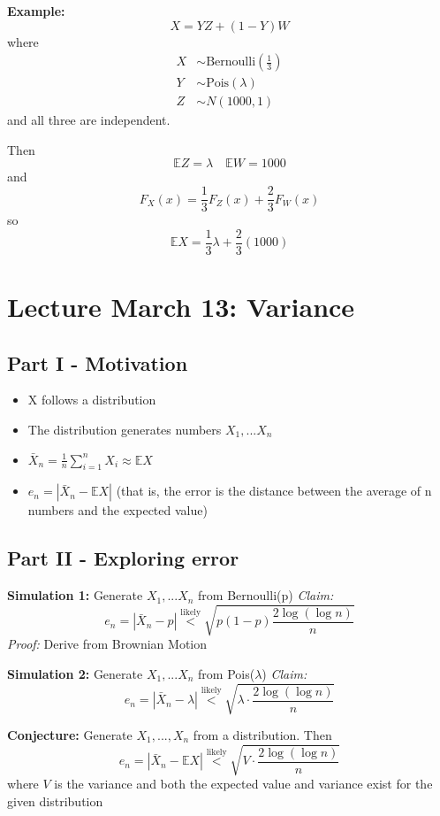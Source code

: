 \documentclass[12pt]{article}
\begin{document}
\textbf{Example:} 
\[X = YZ + (1 - Y)W\]
where 
\begin{align*}
    X &\sim \text{Bernoulli}(\frac{1}{3})\\
    Y &\sim \text{Pois}(\lambda)\\
    Z &\sim N(1000, 1)
\end{align*}
and all three are independent.

Then 
\[\mathbb{E}Z = \lambda \quad \mathbb{E}W = 1000\] 
and 
\[F_X(x) = \frac{1}{3}F_Z(x) + \frac{2}{3}F_W(x)\]
so 
\[\mathbb{E}X = \frac{1}{3}\lambda + \frac{2}{3}(1000)\]

\section*{Lecture March 13: Variance}
\subsection*{Part I - Motivation}
\begin{itemize}
    \item X follows a distribution
    \item The distribution generates numbers $X_1, ... X_n$
    \item $\bar{X}_n = \frac{1}{n}\sum_{i=1}^n X_i \approx \mathbb{E}X$
    \item $e_n = |\bar{X}_n - \mathbb{E}X|$ 
    (that is, the error is the distance between the average of n numbers and the expected value)
\end{itemize}

\subsection*{Part II - Exploring error}
\textbf{Simulation 1:} Generate $X_1, ... X_n$ from Bernoulli(p)
\emph{Claim:} 
\[e_n = |\bar{X}_n - p| \overset{\text{likely}}{<} \sqrt{p(1-p)\frac{2\log(\log n)}{n}}\]
\emph{Proof:} Derive from Brownian Motion

\textbf{Simulation 2:} Generate $X_1, ... X_n$ from Pois($\lambda$)
\emph{Claim:} 
\[e_n = |\bar{X}_n - \lambda| \overset{\text{likely}}{<} \sqrt{\lambda\cdot \frac{2\log(\log n)}{n}}\]

\textbf{Conjecture:} Generate $X_1, ..., X_n$ from a distribution. Then
\[e_n = |\bar{X}_n - \mathbb{E}X| \overset{\text{likely}}{<} \sqrt{V \cdot \frac{2\log(\log n)}{n}}\]
where $V$ is the variance and both the expected value and variance exist for the given distribution
\end{document}
